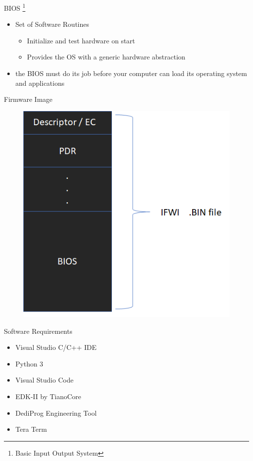 \begin{frame}{BIOS \footnote{Basic Input Output System}}
    \begin{itemize}
        \item Set of Software Routines
            \begin{itemize}
                \item Initialize and test hardware on start
                \item Provides the OS with a generic hardware abstraction
            \end{itemize}
        \item the BIOS must do its job before your computer can load its operating system and applications
    \end{itemize}
\end{frame}

\begin{frame}{Firmware Image}
    \begin{figure}[htbp]
        \centering
        \includegraphics[width=0.6\linewidth]{Im/figures/design/integrated-firmware-image}
    \end{figure}
\end{frame}

\begin{frame}{Software Requirements}
    \begin{itemize}
        \item Visual Studio C/C++ IDE
        \item Python 3
        \item Visual Studio Code
        \item EDK-II by TianoCore
        \item DediProg Engineering Tool
        \item Tera Term
    \end{itemize}
\end{frame}